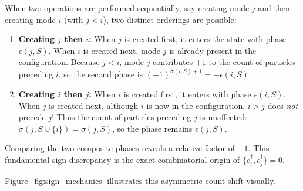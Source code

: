When two operations are performed sequentially, say creating mode $j$ and then creating mode $i$ (with $j < i$), two distinct orderings are possible:
\begin{enumerate}
    \item \textbf{Creating $j$ then $i$:} When $j$ is created first, it enters the state with phase $\epsilon(j, S)$. When $i$ is created next, mode $j$ is already present in the configuration. Because $j < i$, mode $j$ contributes $+1$ to the count of particles preceding $i$, so the second phase is $(-1)^{\sigma(i, S) + 1} = -\epsilon(i, S)$.
    \item \textbf{Creating $i$ then $j$:} When $i$ is created first, it enters with phase $\epsilon(i, S)$. When $j$ is created next, although $i$ is now in the configuration, $i > j$ does \emph{not} precede $j$! Thus the count of particles preceding $j$ is unaffected: $\sigma(j, S \cup \{i\}) = \sigma(j, S)$, so the phase remains $\epsilon(j, S)$.
\end{enumerate}
Comparing the two composite phases reveals a relative factor of $-1$. This fundamental sign discrepancy is the exact combinatorial origin of $\{c_i^\dagger, c_j^\dagger\} = 0$.

Figure~\ref{fig:sign_mechanics} illustrates this asymmetric count shift visually.

